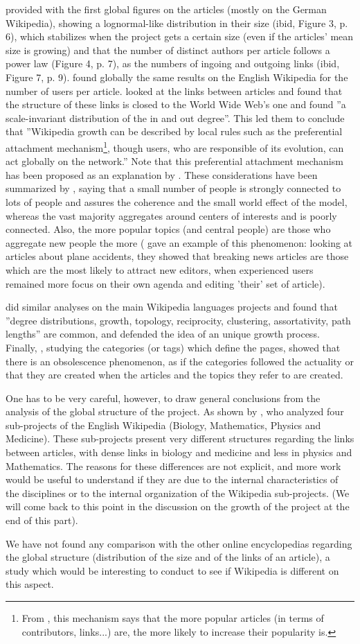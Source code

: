 \citet{Voss05} provided with the first global figures on the articles
(mostly on the German Wikipedia), showing a lognormal-like distribution
in their size (ibid, Figure 3, p. 6), which stabilizes when the project
gets a certain size (even if the articles' mean size is growing) and
that the number of distinct authors per article follows a power law
(Figure 4, p. 7), as the numbers of ingoing and outgoing links (ibid,
Figure 7, p. 9). \citet{NazirTakeda08} found globally the same results
on the English Wikipedia for the number of users per article. \citet{Capoccietal06}
looked at the links between articles and found that the structure
of these links is closed to the World Wide Web's one and found ''a
scale-invariant distribution of the in and out degree''. This led
them to conclude that ''Wikipedia growth can be described by local
rules such as the preferential attachment mechanism\footnote{From \citet{BarabasiAlbert99}, this mechanism says that the more
popular articles (in terms of contributors, links...) are, the more
likely to increase their popularity is. }, though users, who are responsible of its evolution, can act globally
on the network.'' Note that this preferential attachment mechanism
has been proposed as an explanation by \citet[p. 9]{Voss05}. These
considerations have been summarized by \citet{WangJinWu09}, saying
that a small number of people is strongly connected to lots of people
and assures the coherence and the small world effect of the model,
whereas the vast majority aggregates around centers of interests and
is poorly connected. Also, the more popular topics (and central people)
are those who aggregate new people the more (\citealp{KeeganGergleContractor12}
gave an example of this phenomenon: looking at articles about plane
accidents, they showed that breaking news articles are those which
are the most likely to attract new editors, when experienced users
remained more focus on their own agenda and editing 'their' set of
article).

\citet{Zlaticetat06} did similar analyses on the main Wikipedia languages
projects and found that ''degree distributions, growth, topology,
reciprocity, clustering, assortativity, path lengths'' are common,
and defended the idea of an unique growth process. Finally, \citet{WangMaCheng10},
studying the categories (or tags) which define the pages, showed that
there is an obsolescence phenomenon, as if the categories followed
the actuality or that they are created when the articles and the topics
they refer to are created. 

One has to be very careful, however, to draw general conclusions from
the analysis of the global structure of the project. As shown by \citet{Silvaetal11},
who analyzed four sub-projects of the English Wikipedia (Biology,
Mathematics, Physics and Medicine). These sub-projects present very
different structures regarding the links between articles, with dense
links in biology and medicine and less in physics and Mathematics.
The reasons for these differences are not explicit, and more work
would be useful to understand if they are due to the internal characteristics
of the disciplines or to the internal organization of the Wikipedia
sub-projects. (We will come back to this point in the discussion on
the growth of the project at the end of this part).

We have not found any comparison with the other online encyclopedias
regarding the global structure (distribution of the size and of the
links of an article), a study which would be interesting to conduct
to see if Wikipedia is different on this aspect.